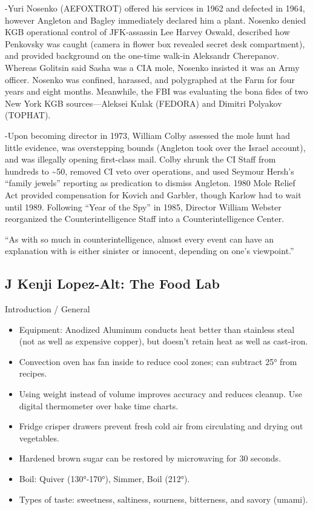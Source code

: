 \documentclass[
]{article}
\begin{document}
-Yuri Nosenko (AEFOXTROT) offered his services in 1962 and defected in
1964, however Angleton and Bagley immediately declared him a plant.
Nosenko denied KGB operational control of JFK-assassin Lee Harvey
Oswald, described how Penkovsky was caught (camera in flower box
revealed secret desk compartment), and provided background on the
one-time walk-in Aleksandr Cherepanov. Whereas Golitsin said Sasha was a
CIA mole, Nosenko insisted it was an Army officer. Nosenko was confined,
harassed, and polygraphed at the Farm for four years and eight months.
Meanwhile, the FBI was evaluating the bona fides of two New York KGB
sources---Aleksei Kulak (FEDORA) and Dimitri Polyakov (TOPHAT).

-Upon becoming director in 1973, William Colby assessed the mole hunt
had little evidence, was overstepping bounds (Angleton took over the
Israel account), and was illegally opening first-class mail. Colby
shrunk the CI Staff from hundreds to \textasciitilde50, removed CI veto
over operations, and used Seymour Hersh's ``family jewels'' reporting as
predication to dismiss Angleton. 1980 Mole Relief Act provided
compensation for Kovich and Garbler, though Karlow had to wait until
1989. Following ``Year of the Spy'' in 1985, Director William Webster
reorganized the Counterintelligence Staff into a Counterintelligence
Center.

``As with so much in counterintelligence, almost every event can have an
explanation with is either sinister or innocent, depending on one's
viewpoint.''

\hypertarget{j-kenji-lopez-alt-the-food-lab}{%
\subsection{J Kenji Lopez-Alt: The Food
Lab}\label{j-kenji-lopez-alt-the-food-lab}}

Introduction / General

\begin{itemize}
\item
  Equipment: Anodized Aluminum conducts heat better than stainless steal
  (not as well as expensive copper), but doesn't retain heat as well as
  cast-iron.
\item
  Convection oven has fan inside to reduce cool zones; can subtract 25°
  from recipes.
\item
  Using weight instead of volume improves accuracy and reduces cleanup.
  Use digital thermometer over bake time charts.
\item
  Fridge crisper drawers prevent fresh cold air from circulating and
  drying out vegetables.
\item
  Hardened brown sugar can be restored by microwaving for 30 seconds.
\item
  Boil: Quiver (130°-170°), Simmer, Boil (212°).
\item
  Types of taste: sweetness, saltiness, sourness, bitterness, and savory
  (umami).
\end{itemize}
\end{document}
